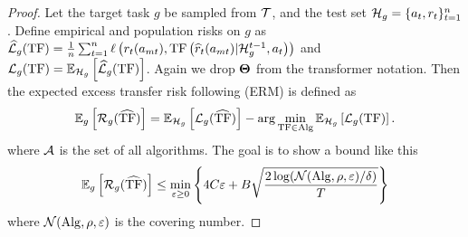 \begin{proof}
Let the target task $g$ be sampled from $\mathcal{T}$, and the test set $\mathcal{H}_{g} = \{a_t, r_t\}_{t=1}^n$. Define empirical and population risks on $g$ as $\widehat{\mathcal{L}}_{g}(\mathrm{TF})=\frac{1}{n} \sum_{t=1}^n \ell\left(r_t(a_{mt}), \mathrm{TF}\left(\widehat{r}_t(a_{mt})|\mathcal{H}_{g}^{t-1}, a_t\right)\right)$ and $\mathcal{L}_{g}(\mathrm{TF})=\mathbb{E}_{\mathcal{H}_{g}}\left[\widehat{\mathcal{L}}_{g}(\mathrm{TF})\right]$. Again we drop $\mathbf{\Theta}$ from the transformer notation. Then the expected excess transfer risk following (ERM) is defined as
\begin{align}
\mathbb{E}_{g}\left[\mathcal{R}_{g}(\widehat{\mathrm{TF}})\right]=\mathbb{E}_{\mathcal{H}_{g}}\left[\mathcal{L}_{g}(\widehat{\mathrm{TF}})\right]-\arg \min _{\mathrm{TF} \in \mathrm{Alg}} \mathbb{E}_{\mathcal{H}_{g}}\left[\mathcal{L}_{g}(\mathrm{TF})\right] . \label{eq:exces-transfer-risk}
\end{align}
where $\mathcal{A}$ is the set of all algorithms. The goal is to show a bound like this
\begin{align*}
\mathbb{E}_{g}\left[\mathcal{R}_{g}(\widehat{\mathrm{TF}})\right] \leq \min _{\varepsilon \geq 0}\left\{4 C \varepsilon+B \sqrt{\frac{2 \log (\mathcal{N}(\mathrm{Alg}, \rho, \varepsilon) / \delta)}{T}}\right\}
\end{align*}
where $\mathcal{N}(\mathrm{Alg}, \rho, \varepsilon)$ is the covering number.


\end{proof}
